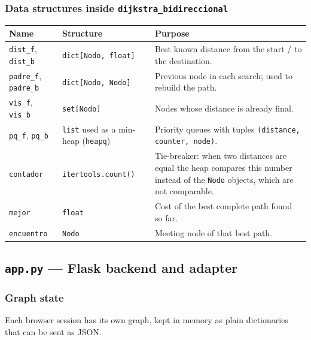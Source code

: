 \documentclass[11pt,letterpaper]{article}
\newcommand{\code}[1]{\texttt{#1}}
\begin{document}
\subsubsection*{Data structures inside \code{dijkstra\_bidireccional}}

\begin{tabularx}{\textwidth}{>{\raggedright\arraybackslash}p{3cm}>{\raggedright\arraybackslash}p{3.8cm}L}
\toprule
\textbf{Name} & \textbf{Structure} & \textbf{Purpose} \\
\midrule
\code{dist\_f}, \code{dist\_b} & \code{dict[Nodo, float]} & Best known distance from the start / to the destination. \\
\code{padre\_f}, \code{padre\_b} & \code{dict[Nodo, Nodo]} & Previous node in each search; used to rebuild the path. \\
\code{vis\_f}, \code{vis\_b} & \code{set[Nodo]} & Nodes whose distance is already final. \\
\code{pq\_f}, \code{pq\_b} & \code{list} used as a min-heap (\code{heapq}) & Priority queues with tuples \code{(distance, counter, node)}. \\
\code{contador} & \code{itertools.count()} & Tie-breaker: when two distances are equal the heap compares this number instead of the \code{Nodo} objects, which are not comparable. \\
\code{mejor} & \code{float} & Cost of the best complete path found so far. \\
\code{encuentro} & \code{Nodo} & Meeting node of that best path. \\
\bottomrule
\end{tabularx}

\subsection{\code{app.py} --- Flask backend and adapter}

\subsubsection*{Graph state}

Each browser session has its own graph, kept in memory as plain dictionaries
that can be sent as JSON.
\end{document}
